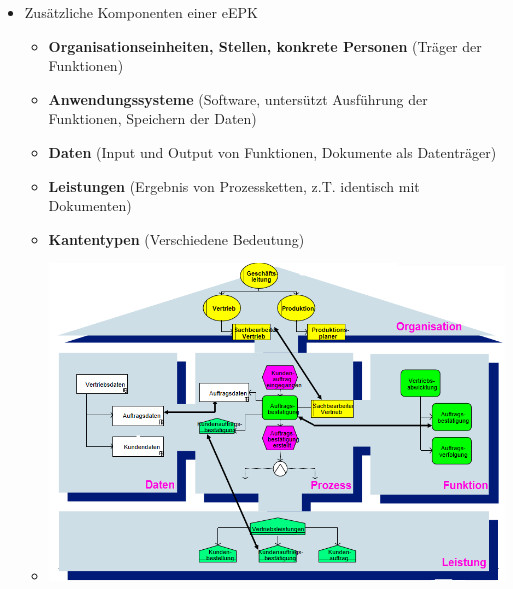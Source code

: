 \documentclass[11pt,a4paper]{article}
\begin{document}
\begin{itemize}
	\item Zusätzliche Komponenten einer eEPK
		\begin{itemize}
		\item \textbf{Organisationseinheiten, Stellen, konkrete Personen} (Träger der Funktionen)
		\item \textbf{Anwendungssysteme} (Software, untersützt Ausführung der Funktionen, Speichern der Daten)
		\item \textbf{Daten} (Input und Output von Funktionen, Dokumente als Datenträger)
		\item \textbf{Leistungen} (Ergebnis von Prozessketten, z.T. identisch mit Dokumenten)
		\item \textbf{Kantentypen} (Verschiedene Bedeutung)
		\item[] \includegraphics[width=15cm]{Bilder/ariseepk}
		\end{itemize}


\end{itemize}
\end{document}
